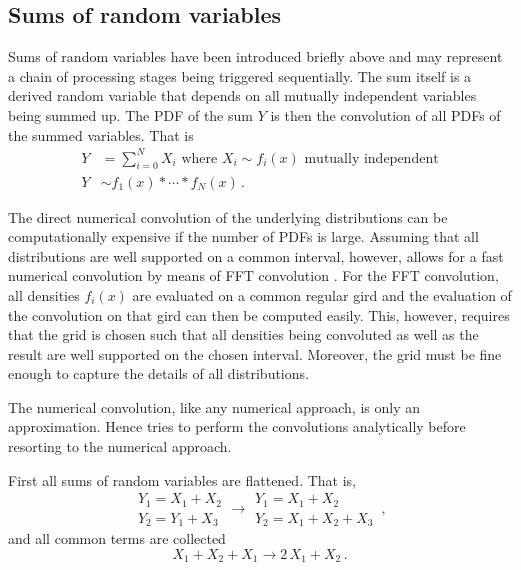 \subsection{Sums of random variables}
Sums of random variables have been introduced briefly above and may represent a chain of processing
stages being triggered sequentially. The sum itself is a derived random variable that depends on all
mutually independent variables being summed up. The PDF of the sum $Y$ is then the convolution of all
PDFs of the summed variables. That is
\begin{align}
 Y &= \sum_{i=0}^NX_i\text{ where } X_i \sim f_i(x)\text{ mutually independent} \nonumber \\
 Y &\sim f_1(x) \ast \cdots \ast f_N(x)\,. \nonumber
\end{align}

The direct numerical convolution of the underlying distributions can be computationally expensive if the
number of PDFs is large. Assuming that all distributions are well supported on a common interval, however, 
allows for a fast numerical convolution by means of FFT convolution \cite[e.g., ][]{Press2007}. For the FFT convolution, all 
densities $f_i(x)$ are evaluated on a common regular gird and the evaluation of the convolution on that gird
can then be computed easily. This, however, requires that the grid is chosen such that all densities being
convoluted as well as the result are well supported on the chosen interval. Moreover, the grid must be fine 
enough to capture the details of all distributions. 

The numerical convolution, like any numerical approach, is only an approximation. Hence  tries to perform
the convolutions analytically before resorting to the numerical approach. 

First all sums of random variables are flattened. That is, 
\begin{equation}
 \begin{array}{l}
  Y_1 = X_1 + X_2\\
  Y_2 = Y_1 + X_3 
 \end{array} \longrightarrow 
 \begin{array}{l}
  Y_1 = X_1 + X_2\\
  Y_2 = X_1 + X_2 + X_3 
 \end{array}\,, \nonumber
\end{equation}
and all common terms are collected
\begin{equation}
 X_1+X_2+X_1 \longrightarrow 2\,X_1+X_2\,. \nonumber
\end{equation}

